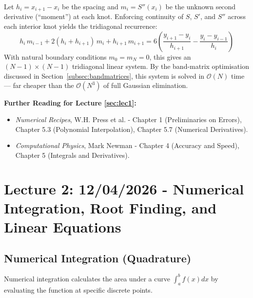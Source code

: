 \documentclass[12pt, a4paper]{article}
\begin{document}
\begin{tcolorbox}[colback=green!5!white,colframe=green!50!black,title=The Tridiagonal System for Cubic Splines]
Let $h_i = x_{i+1} - x_i$ be the spacing and $m_i = S''(x_i)$ be the unknown second derivative (``moment'') at each knot. Enforcing continuity of $S$, $S'$, and $S''$ across each interior knot yields the tridiagonal recurrence:
\begin{equation}
\label{eq:spline_tridiag}
h_i\, m_{i-1} + 2(h_i + h_{i+1})\, m_i + h_{i+1}\, m_{i+1} = 6\left(\frac{y_{i+1}-y_i}{h_{i+1}} - \frac{y_i - y_{i-1}}{h_i}\right)
\end{equation}
With natural boundary conditions $m_0 = m_N = 0$, this gives an $(N-1)\times(N-1)$ tridiagonal linear system. By the band-matrix optimisation discussed in Section~\ref{subsec:bandmatrices}, this system is solved in $\mathcal{O}(N)$ time — far cheaper than the $\mathcal{O}(N^3)$ of full Gaussian elimination.
\end{tcolorbox}

\vspace{0.5cm}
\noindent \textbf{Further Reading for Lecture \ref{sec:lec1}:}
\begin{itemize}
    \item \textit{Numerical Recipes}, W.H. Press et al. - Chapter 1 (Preliminaries on Errors), Chapter 5.3 (Polynomial Interpolation), Chapter 5.7 (Numerical Derivatives).
    \item \textit{Computational Physics}, Mark Newman - Chapter 4 (Accuracy and Speed), Chapter 5 (Integrals and Derivatives).
\end{itemize}

\newpage
\section{Lecture 2: 12/04/2026 - Numerical Integration, Root Finding, and Linear Equations}
\label{sec:lec2}

\subsection{Numerical Integration (Quadrature)}
\label{subsec:integration}
Numerical integration calculates the area under a curve $\int_a^b f(x)dx$ by evaluating the function at specific discrete points.
\end{document}
